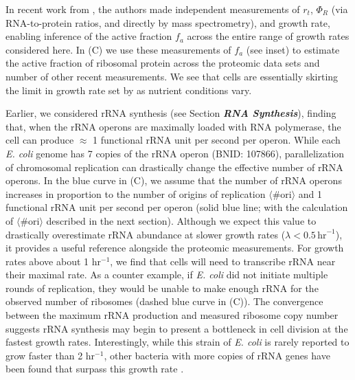 In recent work from \cite{dai2016}, the authors made independent measurements of
$r_t$, $\Phi_R$ (via RNA-to-protein ratios, and directly by mass spectrometry),
and growth rate, enabling inference of the active fraction $f_a$ across the
entire range of growth rates considered here. In (C) we use
these measurements of $f_a$ (see inset) to estimate the active fraction of
ribosomal protein across the proteomic data sets and number of other recent
measurements. We see that cells are essentially skirting the limit in growth
rate set by  as nutrient conditions vary.

Earlier, we considered rRNA synthesis (see Section \textit{\bf RNA Synthesis}),
finding that, when the rRNA operons are maximally loaded with RNA polymerase,
the cell can produce $\approx$ 1 functional rRNA unit per second per operon.
While each \textit{E. coli} genome has 7 copies of the rRNA operon (BNID:
107866), parallelization of chromosomal replication can drastically change the
effective  number of rRNA operons. In the blue curve in (C),
we assume that the number of rRNA operons increases in proportion to the number
of origins of replication $\langle\text{\# ori}\rangle$ and 1 functional rRNA
unit per second per operon (solid blue line; with the calculation of
$\langle\text{\# ori}\rangle$ described in the next section). Although we expect
this value to drastically overestimate rRNA abundance at slower growth rates
($\lambda < 0.5\, \text{hr}^{-1}$), it provides a useful reference alongside the
proteomic measurements. For growth rates above about 1 hr$^{-1}$, we find that
cells will need to transcribe rRNA near their maximal rate. As a counter
example, if \textit{E. coli} did not initiate multiple rounds of replication,
they would be unable to make enough rRNA for the observed number of ribosomes
(dashed blue curve in (C)).  The convergence between the
maximum rRNA production and measured ribosome copy number suggests rRNA
synthesis may begin to present a bottleneck in cell division at the fastest
growth rates. Interestingly, while this strain of \textit{E. coli} is rarely
reported to grow faster than 2 hr$^{-1}$, other bacteria with more copies of
rRNA genes have been found that surpass this growth rate
\citep{bremer2008,roller2016}.
